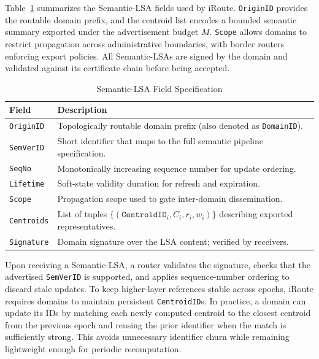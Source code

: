 \documentclass[journal]{IEEEtran}
\newcommand{\sysname}{iRoute}
\begin{document}
Table~\ref{tab:lsa_format} summarizes the Semantic-LSA fields used by \sysname{}.
\texttt{OriginID} provides the routable domain prefix, and the centroid list encodes a bounded semantic summary exported under the advertisement budget $M$.
\texttt{Scope} allows domains to restrict propagation across administrative boundaries, with border routers enforcing export policies.
All Semantic-LSAs are signed by the domain and validated against its certificate chain before being accepted.

\begin{table}[h]
\centering
\caption{Semantic-LSA Field Specification}
\label{tab:lsa_format}
\renewcommand{\arraystretch}{1.3}
\begin{tabular}{l|p{5.0cm}}
\toprule
\textbf{Field} & \textbf{Description} \\
\midrule
\texttt{OriginID} & Topologically routable domain prefix (also denoted as \texttt{DomainID}). \\
\texttt{SemVerID} & Short identifier that maps to the full semantic pipeline specification. \\
\texttt{SeqNo} & Monotonically increasing sequence number for update ordering. \\
\texttt{Lifetime} & Soft-state validity duration for refresh and expiration. \\
\texttt{Scope} & Propagation scope used to gate inter-domain dissemination. \\
\texttt{Centroids} & List of tuples $\{(\texttt{CentroidID}_i, C_i, r_i, w_i)\}$ describing exported representatives. \\
\texttt{Signature} & Domain signature over the LSA content; verified by receivers. \\
\bottomrule
\end{tabular}
\end{table}

Upon receiving a Semantic-LSA, a router validates the signature, checks that the advertised \texttt{SemVerID} is supported, and applies sequence-number ordering to discard stale updates.
To keep higher-layer references stable across epochs, \sysname{} requires domains to maintain persistent \texttt{CentroidID}s.
In practice, a domain can update its IDs by matching each newly computed centroid to the closest centroid from the previous epoch and reusing the prior identifier when the match is sufficiently strong.
This avoids unnecessary identifier churn while remaining lightweight enough for periodic recomputation.
\end{document}
